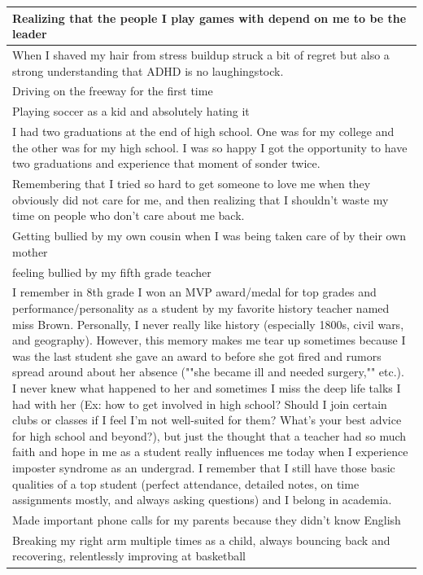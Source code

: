 \documentclass[
  .7em,
  letterpaper,
  DIV=11,
  numbers=noendperiod]{scrartcl}
\begin{document}
\begin{table}
\begin{tabular}{l}
\hline
Realizing that the people I play games with depend on me to be the leader\\
\hline
When I shaved my hair from stress buildup struck a bit of regret but also a strong understanding that ADHD is no laughingstock.\\
\hline
Driving on the freeway for the first time\\
\hline
Playing soccer as a kid and absolutely hating it\\
\hline
I had two graduations at the end of high school. One was for my college and the other was for my high school. I was so happy I got the opportunity to have two graduations and experience that moment of sonder twice.\\
\hline
Remembering that I tried so hard to get someone to love me when they obviously did not care for me, and then realizing that I shouldn't waste my time on people who don't care about me back.\\
\hline
Getting bullied by my own cousin when I was being taken care of by their own mother\\
\hline
feeling bullied by my fifth grade teacher\\
\hline
I remember in 8th grade I won an MVP award/medal for top grades and performance/personality as a student by my favorite history teacher named miss Brown. Personally, I never really like history (especially 1800s, civil wars, and geography). However, this memory makes me tear up sometimes because I was the last student she gave an award to before she got fired and rumors spread around about her absence (""she became ill and needed surgery,"" etc.). I never knew what happened to her and sometimes I miss the deep life talks I had with her (Ex: how to get involved in high school? Should I join certain clubs or classes if I feel I'm not well-suited for them? What's your best advice for high school and beyond?), but just the thought that a teacher had so much faith and hope in me as a student really influences me today when I experience imposter syndrome as an undergrad. I remember that I still have those basic qualities of a top student (perfect attendance, detailed notes, on time assignments mostly, and always asking questions) and I belong in academia.\\
\hline
Made important phone calls for my parents because they didn't know English\\
\hline
Breaking my right arm multiple times as a child, always bouncing back and recovering, relentlessly improving at basketball\\

\end{tabular}
\end{table}
\end{document}
